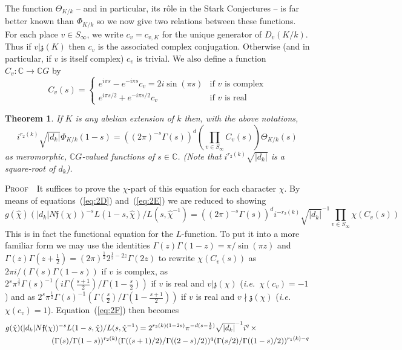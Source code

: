 \documentclass[12pt]{article}
\newtheorem{thm}{Theorem}[section]
\newcounter{rem}[section]%
\newcommand{\bbC}{\ensuremath{\mathbb{C}}}
\newcommand{\beql}[1]{\begin{equation}\label{#1}}
\newcommand{\bPf}{\noindent \textsc{Proof\ }}
\newcommand{\eeq}{\end{equation}}
\newcommand{\ff}{\ensuremath{\mathfrak{f}}}
\newcommand{\fz}{\ensuremath{\mathfrak{z}}}
\newcommand{\half}{\frac{1}{2}}
\newcommand{\ie}{\emph{i.e.}}
\newcommand{\inv}{^{-1}}%
\newcommand{\ndiv}{\nmid}
\newcommand{\refeq}[1]{~(\ref{eq:#1})}
\newcommand{\rem}{\refstepcounter{rem}\noindent{\sc Remark \therem}}%
\renewcommand{\therem}{\thesection.\arabic{rem}}
\newcommand{\PhiKk}{\ensuremath{\Phi_{K/k}}}
\newcommand{\ThetaKk}{\ensuremath{\Theta_{K/k}}}
\begin{document}
The function $\Theta_{K/k}$ -- and in particular, its r\^ole in the Stark
Conjectures -- is far better known than $\Phi_{K/k}$ so we now
give two relations between these functions.
For each place $v\in S_\infty$, we
write $c_v=c_{v,K}$ for
the unique generator of $D_v(K/k)$. Thus if $v|\fz(K)$  then $c_v$ is the associated
complex conjugation.
Otherwise (and in particular, if $v$ is itself complex) $c_v$ is trivial.
We also define a function $C_v:\bbC\rightarrow \bbC G$ by
\[
C_v(s)=\left\{
\begin{array}{ll}
e^{i\pi s}-e^{-i\pi s}c_v=2i\sin(\pi s)&
\mbox{if $v$ is complex}\\
e^{i\pi s/2}+e^{-i\pi s/2}c_v&
\mbox{if $v$ is real}
\end{array}
\right.
\]
\begin{thm}\label{thm:2A}
If $K$ is any abelian extension of $k$ then, with the above notations,
\[
i^{r_2(k)}\sqrt{|d_k|}\PhiKk(1-s)=
((2\pi)^{-s}\Gamma(s))^d\left(\prod_{v\in S_\infty}C_v(s)\right)\ThetaKk(s)
\]
as meromorphic, $\bbC G$-valued functions of $s\in\bbC$.
(Note that $i^{r_2(k)}\sqrt{|d_k|}$ is a square-root of $d_k$).
\end{thm}
\bPf\ It suffices to prove the $\chi$-part of this equation for
each character $\chi$. By means of equations\refeq{2D} and\refeq{2E} we are reduced to showing
\beql{eq:2F}
g(\hat{\chi})(|d_k|N\ff(\chi))^{-s}L(1-s,\hat{\chi})/L(s,\hat{\chi}\inv)=
((2\pi)^{-s}\Gamma(s))^d
i^{-r_2(k)}\sqrt{|d_k|}\inv
\prod_{v\in S_\infty}\chi(C_v(s))
\eeq
This is in fact the functional equation for the $L$-function. To put it into
a more familiar form we may use
the identities $\Gamma(z)\Gamma(1-z)=\pi/\sin(\pi z)$
and $\Gamma(z)\Gamma(z+\half)=(2\pi)^\half 2^{\half-2z}\Gamma(2z)$
to rewrite $\chi(C_v(s))$ as $2\pi i/(\Gamma(s)\Gamma(1-s))$ if $v$ is complex, as
$2^s\pi^\half\Gamma(s)\inv \left(i\Gamma(\frac{s+1}{2})/\Gamma(1-\frac{s}{2})\right)$
if $v$ is real and $v|\fz(\chi)$ (\ie\ $\chi(c_v)=-1$)
and as
$2^s\pi^\half\Gamma(s)\inv \left(\Gamma(\frac{s}{2})/\Gamma(1-\frac{s+1}{2})\right)$
if $v$ is real and $v\ndiv\fz(\chi)$ (\ie\ $\chi(c_v)=1$).
Equation\refeq{2F} then becomes
\begin{eqnarray*}
\lefteqn{
g(\hat{\chi})(|d_k|N\ff(\chi))^{-s}L(1-s,\hat{\chi})/L(s,\hat{\chi}\inv)=
2^{r_2(k)(1-2s)}\pi^{-d(s-\half)}\sqrt{|d_k|}\inv i^q\,\times
}\hspace{5em}&&\\
&&(\Gamma(s)/\Gamma(1-s))^{r_2(k)}(\Gamma((s+1)/2)/\Gamma((2-s)/2))^{q}
(\Gamma(s/2)/\Gamma((1-s)/2))^{r_1(k)-q}\\
\end{eqnarray*}
\end{document}
